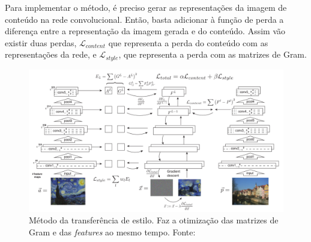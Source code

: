 Para implementar o método, é preciso
gerar as representações da imagem de
conteúdo na rede convolucional.
Então, basta adicionar
à função de perda a diferença entre
a representação da imagem gerada e do
conteúdo. Assim vão existir duas perdas,
$\mathcal{L}_{content}$ que representa
a perda do conteúdo com as representações
da rede, e $\mathcal{L}_{style}$, que
representa a perda com as matrizes de Gram.




\begin{figure}[!ht]
	\centering
	\includegraphics[width=\linewidth]{files/assets/articles/gatys3.png}
	\caption{Método da transferência de estilo. Faz a otimização
	das matrizes de Gram e das \textit{features} ao mesmo tempo.
	Fonte: \cite{Gatys2016}}
	\label{img:preview}
\end{figure}




\fi